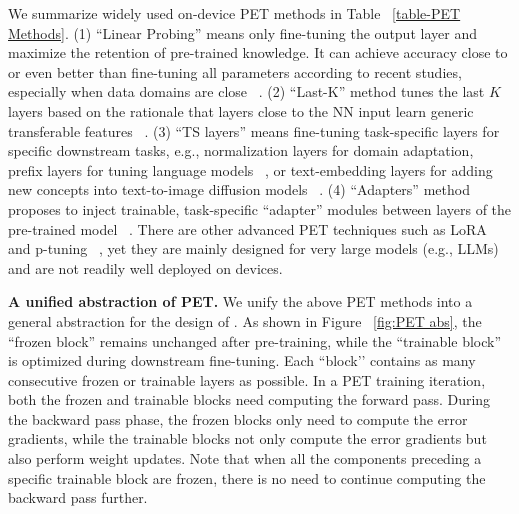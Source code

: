 We summarize widely used on-device PET methods in Table ~\ref{table-PET Methods}.
(1) ``Linear Probing'' means only fine-tuning the output layer and maximize the retention of pre-trained knowledge.%
It can achieve accuracy close to or even better than fine-tuning all parameters according to recent studies, especially when data domains are close ~\cite{lin2022could, kornblith2019better, salman2020adversarially, kumar2022finetuning}.
(2) ``Last-K'' method tunes the last $K$ layers based on the rationale that layers close to the NN input learn generic transferable features ~\cite{MLSYS2019_e09d45e1, guo2019spottune, chatfield2014return}.
(3) ``TS layers'' means fine-tuning task-specific layers for specific downstream tasks, e.g., normalization layers for domain adaptation, prefix layers for tuning language models ~\cite{li2021prefix}, or text-embedding layers for adding new concepts into text-to-image diffusion models ~\cite{gal2022image}.
(4) ``Adapters'' method proposes to inject trainable, task-specific ``adapter'' modules between layers of the pre-trained model ~\cite{rebuffi2017learning, houlsby2019parameter}.
There are other advanced PET techniques such as LoRA ~\cite{hu2022lora} and p-tuning ~\cite{liu-etal-2022-p}, yet they are mainly designed for very large models (e.g., LLMs) and are not readily well deployed on devices.

\noindent \textbf{A unified abstraction of PET.}
We unify the above PET methods into a general abstraction for the design of \sys.
As shown in Figure ~\ref{fig:PET abs}, the ``frozen block'' remains unchanged after pre-training, while the ``trainable block'' is optimized during downstream fine-tuning.
Each ``block’' contains as many consecutive frozen or trainable layers as possible.
In a PET training iteration, both the frozen and trainable blocks need computing the forward pass.
During the backward pass phase, the frozen blocks only need to compute the error gradients, while the trainable blocks not only compute the error gradients but also perform weight updates.
Note that when all the components preceding a specific trainable block are frozen, there is no need to continue computing the backward pass further.

